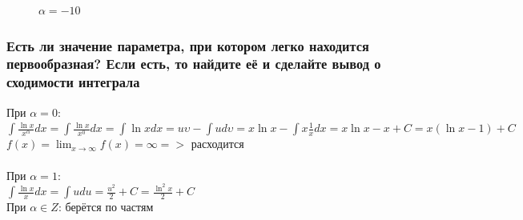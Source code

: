 \documentclass{article}
\begin{document}
\begin{figure}[h!]
\caption*{$ \alpha = -10 $}
\end{figure}
\subsubsection{Есть ли значение параметра, при котором легко находится первообразная? Если есть, то найдите её и сделайте вывод о сходимости интеграла}
При $ \alpha = 0 $:\\
\large
$ \int\limits \frac{\ln{x}}{x^{\alpha}}dx = \int\limits \frac{\ln{x}}{x^0}dx = \int\limits \ln{x}dx = u\upsilon - \int\limits ud\upsilon = x\ln{x} - \int\limits x\frac{1}{x}dx = x\ln{x} - x + C = x(\ln{x} - 1) + C $\\
$ f(x) = \lim_{x\to \infty} f(x) = \infty => $ расходится\\\\
\normalsize
При $ \alpha = 1 $:\\
\large
$ \int\limits \frac{\ln{x}}{x}dx = \int\limits udu = \frac{u^2}{2} + C = \frac{\ln^2{x}}{2} + C $\\
\normalsize
При $ \alpha \in Z $: берётся по частям
\newpage
\end{document}
